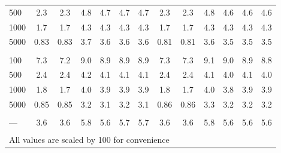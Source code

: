 \documentclass[AMA,STIX1COL,doublespace]{WileyNJD-v2}
\begin{document}
\begin{table}
\begin{tabular}[t]{lcccccccccccc}
\hspace{1em}500 & 2.3 & 2.3 & 4.8 & 4.7 & 4.7 & 4.7 & 2.3 & 2.3 & 4.8 & 4.6 & 4.6 & 4.6\\
\hspace{1em}1000 & 1.7 & 1.7 & 4.3 & 4.3 & 4.3 & 4.3 & 1.7 & 1.7 & 4.3 & 4.3 & 4.3 & 4.3\\
\hspace{1em}5000 & 0.83 & 0.83 & 3.7 & 3.6 & 3.6 & 3.6 & 0.81 & 0.81 & 3.6 & 3.5 & 3.5 & 3.5\\
\addlinespace[0.75em]
\multicolumn{13}{l}{\textbf{10 predictors, 490 junk}}\\
\hline
\hspace{1em}100 & 7.3 & 7.2 & 9.0 & 8.9 & 8.9 & 8.9 & 7.3 & 7.3 & 9.1 & 9.0 & 8.9 & 8.8\\
\hspace{1em}500 & 2.4 & 2.4 & 4.2 & 4.1 & 4.1 & 4.1 & 2.4 & 2.4 & 4.1 & 4.0 & 4.1 & 4.0\\
\hspace{1em}1000 & 1.8 & 1.7 & 4.0 & 3.9 & 3.9 & 3.9 & 1.8 & 1.7 & 4.0 & 3.8 & 3.9 & 3.9\\
\hspace{1em}5000 & 0.85 & 0.85 & 3.2 & 3.1 & 3.2 & 3.1 & 0.86 & 0.86 & 3.3 & 3.2 & 3.2 & 3.2\\
\addlinespace[0.75em]
\multicolumn{13}{l}{\textbf{Overall}}\\
\hline
\hspace{1em}--- & 3.6 & 3.6 & 5.8 & 5.6 & 5.7 & 5.7 & 3.6 & 3.6 & 5.8 & 5.6 & 5.6 & 5.6\\
\bottomrule
\multicolumn{13}{l}{\textsuperscript{} All values are scaled by 100 for convenience}\\
\end{tabular}
\end{table}
\end{document}
